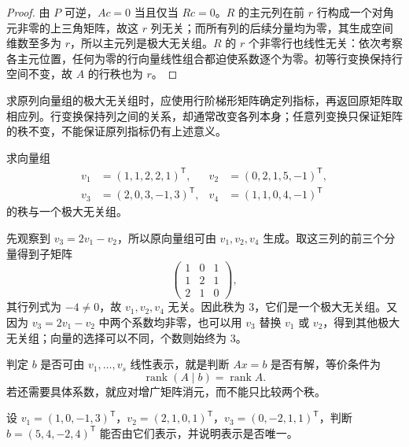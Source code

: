 \begin{proof}
由 $P$ 可逆，$Ac=0$ 当且仅当 $Rc=0$。$R$ 的主元列在前 $r$ 行构成一个对角元非零的上三角矩阵，故这 $r$ 列无关；而所有列的后续分量均为零，其生成空间维数至多为 $r$，所以主元列是极大无关组。$R$ 的 $r$ 个非零行也线性无关：依次考察各主元位置，任何为零的行向量线性组合都迫使系数逐个为零。初等行变换保持行空间不变，故 $A$ 的行秩也为 $r$。
\end{proof}

\begin{notealert}[type=caution,title={返回原矩阵取列向量}]
求原列向量组的极大无关组时，应使用行阶梯形矩阵确定列指标，再返回原矩阵取相应列。行变换保持列之间的关系，却通常改变各列本身；任意列变换只保证矩阵的秩不变，不能保证原列指标仍有上述意义。
\end{notealert}

\begin{example}
\label{ex:laex-maximal-subset}
求向量组
\[
\begin{aligned}
v_1&=(1,1,2,2,1)^{\mathsf T},&v_2&=(0,2,1,5,-1)^{\mathsf T},\\
v_3&=(2,0,3,-1,3)^{\mathsf T},&v_4&=(1,1,0,4,-1)^{\mathsf T}
\end{aligned}
\]
的秩与一个极大无关组。
\end{example}

\begin{solve}
先观察到 $v_3=2v_1-v_2$，所以原向量组可由 $v_1,v_2,v_4$ 生成。取这三列的前三个分量得到子矩阵
\[
\begin{pmatrix}1&0&1\\1&2&1\\2&1&0\end{pmatrix},
\]
其行列式为 $-4\ne0$，故 $v_1,v_2,v_4$ 无关。因此秩为 $3$，它们是一个极大无关组。又因为 $v_3=2v_1-v_2$ 中两个系数均非零，也可以用 $v_3$ 替换 $v_1$ 或 $v_2$，得到其他极大无关组；向量的选择可以不同，个数则始终为 $3$。
\end{solve}

判定 $b$ 是否可由 $v_1,\ldots,v_s$ 线性表示，就是判断 $Ax=b$ 是否有解，等价条件为
\begin{equation}
\label{eq:laex-linear-representation-rank}
\operatorname{rank}(A\mid b)=\operatorname{rank}A.
\end{equation}
若还需要具体系数，就应对增广矩阵消元，而不能只比较两个秩。

\begin{example}
\label{ex:laex-representation}
设 $v_1=(1,0,-1,3)^{\mathsf T}$，$v_2=(2,1,0,1)^{\mathsf T}$，$v_3=(0,-2,1,1)^{\mathsf T}$，判断 $b=(5,4,-2,4)^{\mathsf T}$ 能否由它们表示，并说明表示是否唯一。
\end{example}

